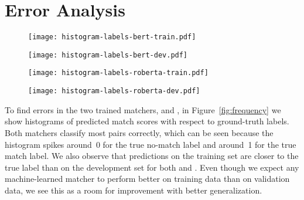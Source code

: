 \section{Error Analysis}\label{error-analysis}

\begin{figure*}
    \centering
    \begin{subfigure}{0.42\textwidth}
        \centering
        \texttt{[image: histogram-labels-bert-train.pdf]}
        \label{subfig:bert_train}
    \end{subfigure}
    \hfill
    \begin{subfigure}{0.42\textwidth}
        \centering
        \texttt{[image: histogram-labels-bert-dev.pdf]}
        \label{subfig:bert_dev}
    \end{subfigure}
    \begin{subfigure}{0.42\textwidth}
        \centering
        \texttt{[image: histogram-labels-roberta-train.pdf]}
        \label{subfig:roberta_train}
    \end{subfigure}
    \hfill
    \begin{subfigure}{0.42\textwidth}
        \centering
        \texttt{[image: histogram-labels-roberta-dev.pdf]}
        \label{subfig:roberta_dev}
    \end{subfigure}
    \caption{Histograms of predicted labels on the training and validation sets for argument key point pairs with the \BertBase and \RobertaBase classifiers. For good classifiers, predicted labels should approximately equal the true label~(0~or~1).}
    \label{fig:frequency}
\end{figure*}
To find errors in the two trained matchers, \BertBase and \RobertaBase, in Figure~\ref{fig:frequency} we show histograms of predicted match scores with respect to ground-truth labels.
Both matchers classify most pairs correctly, which can be seen because the histogram spikes around~0 for the true no-match label and around~1 for the true match label.
We also observe that predictions on the training set are closer to the true label than on the development set for both \RobertaBase and \BertBase.
Even though we expect any machine-learned matcher to perform better on training data than on validation data, we see this as a room for improvement with better generalization.
